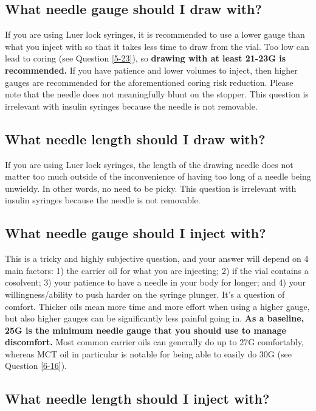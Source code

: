 \documentclass{article}
\begin{document}
\subsection{What needle gauge should I draw with?}

If you are using Luer lock syringes, it is recommended to use a lower gauge than what you inject with so that it takes less time to draw from the vial. Too low can lead to coring (see Question \ref{5-23}), so \textbf{drawing with at least 21-23G is recommended.} If you have patience and lower volumes to inject, then higher gauges are recommended for the aforementioned coring risk reduction. Please note that the needle does not meaningfully blunt on the stopper. This question is irrelevant with insulin syringes because the needle is not removable.

\subsection{What needle length should I draw with?}

If you are using Luer lock syringes, the length of the drawing needle does not matter too much outside of the inconvenience of having too long of a needle being unwieldy. In other words, no need to be picky. This question is irrelevant with insulin syringes because the needle is not removable.

\subsection{What needle gauge should I inject with?}\label{5-16}

This is a tricky and highly subjective question, and your answer will depend on 4 main factors: 1) the carrier oil for what you are injecting; 2) if the vial contains a cosolvent; 3) your patience to have a needle in your body for longer; and 4) your willingness/ability to push harder on the syringe plunger. It’s a question of comfort. Thicker oils mean more time and more effort when using a higher gauge, but also higher gauges can be significantly less painful going in. \textbf{As a baseline, 25G is the minimum needle gauge that you should use to manage discomfort.} Most common carrier oils can generally do up to 27G comfortably, whereas MCT oil in particular is notable for being able to easily do 30G (see Question \ref{6-16}).

\subsection{What needle length should I inject with?}\label{5-17}
\end{document}
